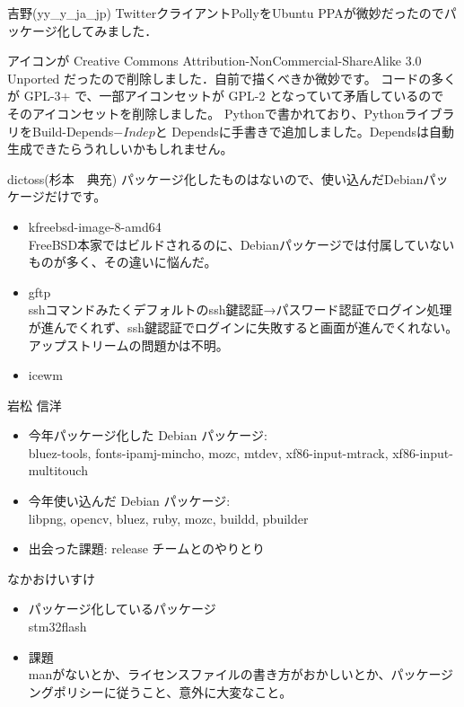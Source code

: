 \begin{prework}{ 吉野(yy\_y\_ja\_jp) }
TwitterクライアントPollyをUbuntu PPAが微妙だったのでパッケージ化してみました．

アイコンが Creative Commons Attribution-NonCommercial-ShareAlike 3.0
Unported だったので削除しました．自前で描くべきか微妙です。
コードの多くが GPL-3+ で、一部アイコンセットが GPL-2 となっていて矛盾しているので
そのアイコンセットを削除しました。
Pythonで書かれており、PythonライブラリをBuild-Depends\(-Indep\)と
Dependsに手書きで追加しました。Dependsは自動生成できたらうれしいかもしれません。
\end{prework}

\begin{prework}{ dictoss(杉本　典充) }
パッケージ化したものはないので、使い込んだDebianパッケージだけです。
\begin{itemize}
\item kfreebsd-image-8-amd64\\
FreeBSD本家ではビルドされるのに、Debianパッケージでは付属していないものが多く、その違いに悩んだ。
\item gftp\\
sshコマンドみたくデフォルトのssh鍵認証→パスワード認証でログイン処理が進んでくれず、ssh鍵認証でログインに失敗すると画面が進んでくれない。アップストリームの問題かは不明。
\item icewm
\end{itemize}
\end{prework}



\begin{prework}{岩松 信洋}

\begin{itemize}
\item 今年パッケージ化した Debian パッケージ:\\
bluez-tools, fonts-ipamj-mincho, mozc, mtdev, xf86-input-mtrack, xf86-input-multitouch
\item 今年使い込んだ Debian パッケージ:\\
libpng, opencv, bluez, ruby, mozc, buildd, pbuilder
\item 出会った課題: 
release チームとのやりとり
\end{itemize}
\end{prework}

\begin{prework}{ なかおけいすけ }
\begin{itemize}
\item パッケージ化しているパッケージ\\
stm32flash
\item 課題\\
manがないとか、ライセンスファイルの書き方がおかしいとか、パッケージングポリシーに従うこと、意外に大変なこと。
\end{itemize}
\end{prework}

